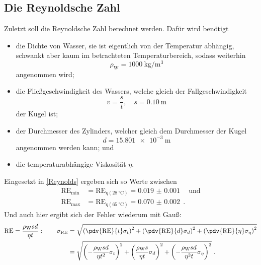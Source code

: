 \subsection{Die Reynoldsche Zahl}
Zuletzt soll die Reynoldsche Zahl berechnet werden. Dafür wird benötigt
\begin{itemize}
	\item die Dichte von Wasser, sie ist eigentlich von der Temperatur abhängig, schwankt aber kaum im betrachteten Temperaturbereich, sodass weiterhin \[ \rho_\text{W}=\SI{1000}{\kilo\gram\per\metre\cubed} \] angenommen wird;
	\item die Fließgeschwindigkeit des Wassers, welche gleich der Fallgeschwindigkeit
	\[ v = \frac{s}{t}, \quad s=\SI{0.10}{\metre} \] der Kugel ist;
	\item der Durchmesser des Zylinders, welcher gleich dem Durchmesser der Kugel \[ d = \SI{15.801e-3}{\metre} \] angenommen werden kann; und
	\item die temperaturabhängige Viskosität $\eta$.
\end{itemize}
Eingesetzt in \eqref{Reynolds} ergeben sich so Werte zwischen
\begin{align}
	\text{RE}_\text{min} &= \text{RE}_{\eta(\SI{28}{\celsius})} = \SI{0.019(1)}{} \quad \text{und} \\
	\text{RE}_\text{max} &= \text{RE}_{\eta(\SI{65}{\celsius})} = \SI{0.070(2)}{} \ .
\end{align}
Und auch hier ergibt sich der Fehler wiederum mit Gauß:
\begin{align}
	\text{RE} = \frac{\rho_\text{W} s d}{\eta t}: \qquad \sigma_{\text{RE}} &= \sqrt{\left(\pdv{\text{RE}}{t}\sigma_t\right)^2+\left(\pdv{\text{RE}}{d}\sigma_d\right)^2+\left(\pdv{\text{RE}}{\eta}\sigma_\eta\right)^2} \\
	&= \sqrt{\left(-\frac{\rho_\text{W}sd}{\eta t^2}\sigma_t\right)^2+\left(\frac{\rho_\text{W}s}{\eta t}\sigma_d\right)^2+\left(-\frac{\rho_\text{W}sd}{\eta^2 t}\sigma_\eta\right)^2} \ .
\end{align}